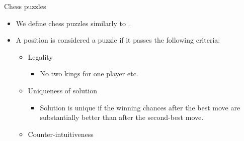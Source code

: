 \documentclass[normaltitle,first=orange,second=red,leqno]{aaltoslides}
\begin{document}
\begin{frame}{Chess puzzles}
    \begin{itemize}
        \item<1-> We define chess puzzles similarly to \citeauthor{feng2025generatingcreativechesspuzzles}.
        \item<2-> A position is considered a puzzle if it passes the following criteria:
        \begin{itemize}
            \item Legality
            \begin{itemize}
                \item No two kings for one player etc.
            \end{itemize}
            \item Uniqueness of solution
            \begin{itemize}
                \item Solution is unique if the winning chances after the best move are substantially better than after the second-best move.
            \end{itemize}
            \item Counter-intuitiveness
        \end{itemize}
    \end{itemize}
\end{frame}

\end{document}
